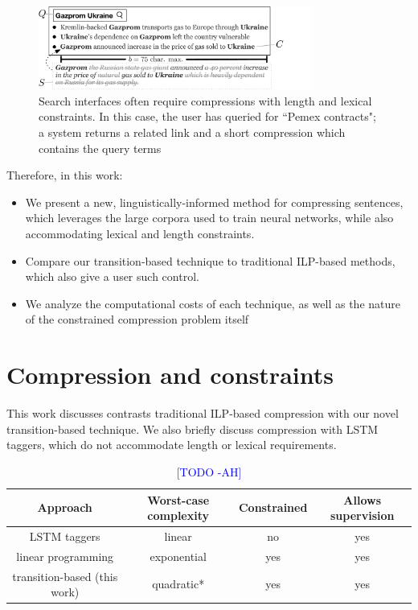 \documentclass[11pt,a4paper]{article}
\newcommand{\ahcomment}[1]{\textcolor{blue}{[#1 -AH]}}
\begin{document}
\begin{figure}[htb!]
\includegraphics[width=9cm]{qf.pdf}
\caption{Search interfaces often require compressions with length and lexical constraints. In this case, the user has queried for ``Pemex contracts"; a system returns a related link and a short compression which contains the query terms}
\label{f:qf}
\end{figure}


Therefore, in this work:

\begin{itemize}
\item{We present a new, linguistically-informed method for compressing sentences, which leverages the large corpora used to train neural networks, while also accommodating lexical and length constraints.}
\item{Compare our transition-based technique to traditional ILP-based methods, which also give a user such control.}
\item{We analyze the computational costs of each technique, as well as the nature of the constrained compression problem itself}
\end{itemize}


\section{Compression and constraints}

This work discusses contrasts traditional ILP-based compression with our novel transition-based technique. We also briefly discuss compression with LSTM taggers, which do not accommodate length or lexical requirements.

\begin{table}[htb!]
\begin{tabular}{cccc}
\textbf{Approach} & \textbf{Worst-case complexity} & \textbf{Constrained} & \textbf{Allows supervision} \\ \hline
LSTM taggers      & linear              & no     &    yes      \\   
linear programming              & exponential         & yes    &    yes   \\
transition-based (this work)       & quadratic*           & yes    &      yes   \\
\end{tabular}
\caption{\ahcomment{TODO}}
\end{table}
\end{document}
